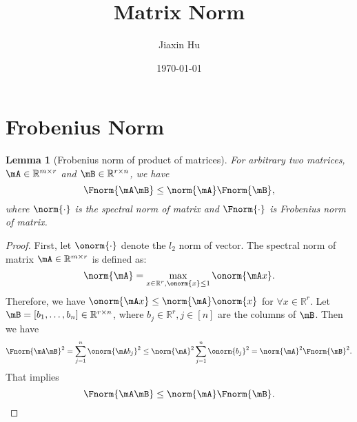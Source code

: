 \documentclass[11pt]{article}
\title{Matrix Norm}
\date{\today}
\author{%
Jiaxin Hu
}
\theoremstyle{plain}
\newtheorem{lem}{Lemma}
\theoremstyle{definition}
\begin{document}

\maketitle


\section{Frobenius Norm}
\begin{lem}[Frobenius norm of product of matrices] For arbitrary two matrices, $\mA \in \mathbb{R}^{m \times r}$ and $\mB \in \mathbb{R}^{r \times n}$, we have
\[ \Fnorm{\mA\mB} \leq \norm{\mA} \Fnorm{\mB} , \]
	where $\norm{\cdot}$ is the spectral norm of matrix and $\Fnorm{\cdot}$ is Frobenius norm of matrix.
\end{lem}

\begin{proof}
	First, let $\onorm{\cdot}$ denote the $l_2$ norm of vector. The spectral norm of matrix $\mA \in \mathbb{R}^{m \times r}$ is defined as:
	\[ \norm{\mA} = \max_{x \in \mathbb{R}^r, \onorm{x} \leq 1} \onorm{\mA x}.  \]
	Therefore, we have $\onorm{\mA x} \leq \norm{\mA} \onorm{x}$ for $\forall x \in \mathbb{R}^r $. Let $\mB = [b_1,\dots, b_n] \in \mathbb{R}^{r \times n}$, where $b_j \in \mathbb{R}^{r}, j \in [n]$ are the columns of $\mB$. Then we have
	\[ \Fnorm{\mA\mB}^2 = \sum_{j = 1}^n \onorm{\mA b_j}^2 \leq  \norm{\mA}^2\sum_{j = 1}^n \onorm{b_j}^2 = \norm{\mA}^2 \Fnorm{\mB}^2 . \]
	That implies 
	\[\Fnorm{\mA\mB} \leq  \norm{\mA} \Fnorm{\mB}. \]
\end{proof}
\end{document}

